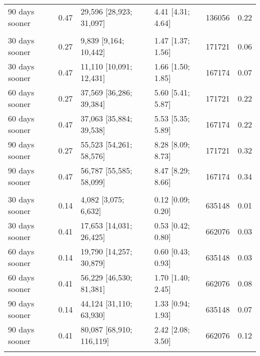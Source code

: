 \documentclass{article}
\begin{document}
\begin{table}
\begin{tabular}[t]{lrllrr}
\hspace{1em}90 days sooner & 0.47 & 29,596 [28,923; 31,097] & 4.41 [4.31; 4.64] & 136056 & 0.22\\
\addlinespace[0.3em]
\multicolumn{6}{l}{\textbf{UK to Jan 2022}}\\
\hspace{1em}30 days sooner & 0.27 & 9,839 [9,164; 10,442] & 1.47 [1.37; 1.56] & 171721 & 0.06\\
\hspace{1em}30 days sooner & 0.47 & 11,110 [10,091; 12,431] & 1.66 [1.50; 1.85] & 167174 & 0.07\\
\hspace{1em}60 days sooner & 0.27 & 37,569 [36,286; 39,384] & 5.60 [5.41; 5.87] & 171721 & 0.22\\
\hspace{1em}60 days sooner & 0.47 & 37,063 [35,884; 39,538] & 5.53 [5.35; 5.89] & 167174 & 0.22\\
\hspace{1em}90 days sooner & 0.27 & 55,523 [54,261; 58,576] & 8.28 [8.09; 8.73] & 171721 & 0.32\\
\hspace{1em}90 days sooner & 0.47 & 56,787 [55,585; 58,099] & 8.47 [8.29; 8.66] & 167174 & 0.34\\
\addlinespace[0.3em]
\multicolumn{6}{l}{\textbf{US to April 2021}}\\
\hspace{1em}30 days sooner & 0.14 & 4,082 [3,075; 6,632] & 0.12 [0.09; 0.20] & 635148 & 0.01\\
\hspace{1em}30 days sooner & 0.41 & 17,653 [14,031; 26,425] & 0.53 [0.42; 0.80] & 662076 & 0.03\\
\hspace{1em}60 days sooner & 0.14 & 19,790 [14,257; 30,879] & 0.60 [0.43; 0.93] & 635148 & 0.03\\
\hspace{1em}60 days sooner & 0.41 & 56,229 [46,530; 81,381] & 1.70 [1.40; 2.45] & 662076 & 0.08\\
\hspace{1em}90 days sooner & 0.14 & 44,124 [31,110; 63,930] & 1.33 [0.94; 1.93] & 635148 & 0.07\\
\hspace{1em}90 days sooner & 0.41 & 80,087 [68,910; 116,119] & 2.42 [2.08; 3.50] & 662076 & 0.12\\
\addlinespace[0.3em]
\multicolumn{6}{l}{\textbf{US to July 2021}}\\

\end{tabular}
\end{table}
\end{document}
